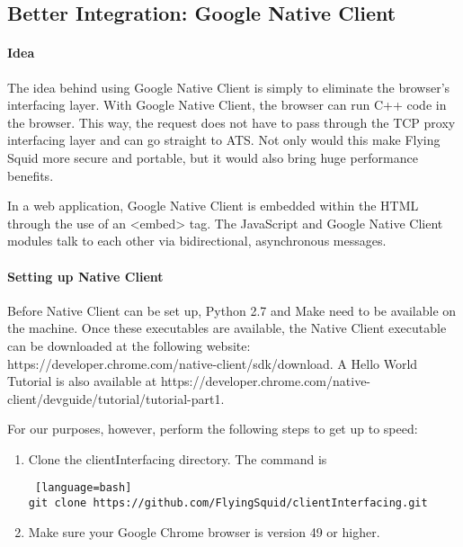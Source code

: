\begin{appendices}



\section{Better Integration: Google Native Client}

\paragraph{Idea}

The idea behind using Google Native Client is simply to eliminate the browser's interfacing layer. With Google Native Client, the browser can run C++ code in the browser. This way, the request does not have to pass through the TCP proxy interfacing layer and can go straight to ATS. Not only would this make Flying Squid more secure and portable, but it would also bring huge performance benefits.

In a web application, Google Native Client is embedded within the HTML through the use of an <embed> tag. The JavaScript and Google Native Client modules talk to each other via bidirectional, asynchronous messages.

\paragraph{Setting up Native Client}

Before Native Client can be set up, Python 2.7 and Make need to be available on the machine. Once these executables are available, the Native Client executable can be downloaded at the following website: https://developer.chrome.com/native-client/sdk/download. A Hello World Tutorial is also available at https://developer.chrome.com/native-client/devguide/tutorial/tutorial-part1.

For our purposes, however, perform the following steps to get up to speed:

\begin{enumerate} 
\item Clone the clientInterfacing directory. The command is 

\begin{lstlisting} [language=bash] 
git clone https://github.com/FlyingSquid/clientInterfacing.git
\end{lstlisting}

\item  Make sure your Google Chrome browser is version 49 or higher.


\end{enumerate}
\end{appendices}
